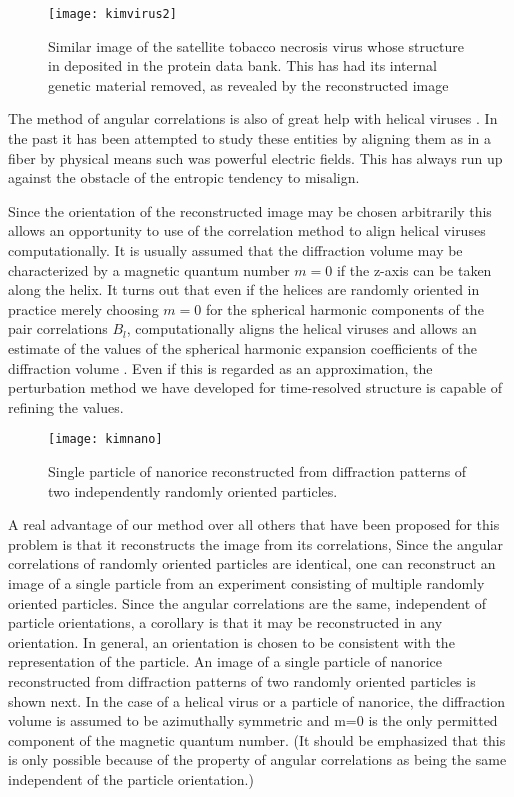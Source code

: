 \begin{figure}[ht]
  \centering
  \texttt{[image: kimvirus2]}
\caption{
Similar image of the satellite tobacco 
necrosis virus whose structure in deposited in 
the protein data bank. This has had its internal 
genetic material removed, as revealed by the 
reconstructed image
}
\label{fig:kimvirus2}
\end{figure}

The method of angular correlations is also of great help with helical viruses \cite{PoonFiber}. In the past it has been attempted to study these entities by aligning them as in a fiber by physical means such was powerful electric fields. This has always run up against the obstacle of the entropic tendency to misalign.

Since the orientation of the reconstructed image may be chosen arbitrarily this allows an opportunity to use of the correlation method to align helical viruses computationally. It is usually assumed that the diffraction volume may be characterized by a magnetic quantum number $m=0$ if the z-axis can be taken along the helix. It turns out that even if the helices are randomly oriented in practice  merely choosing $m=0$ for the spherical harmonic components of the pair correlations $B_l$, computationally aligns the helical viruses and allows an estimate of the values of the spherical harmonic expansion coefficients of the diffraction volume \cite{PoonFiber}. Even if this is regarded as an approximation, the perturbation method we have developed for time-resolved structure \cite{pande2014} is capable of refining the values.

\begin{figure}[ht]
  \centering
  \texttt{[image: kimnano]}
\caption{
Single particle of nanorice 
reconstructed from diffraction patterns of two 
independently randomly oriented particles.
}
\label{fig:kimnano}
\end{figure}

A real advantage of our method over all others that have been proposed for this problem is that it reconstructs the image from its correlations, Since the angular correlations of randomly oriented particles are identical, one can reconstruct an image of a single particle from an experiment consisting of multiple randomly oriented particles. Since the angular correlations are the same, independent of particle orientations, a corollary is that it may be reconstructed in any orientation. In general, an orientation is chosen to be consistent with the representation of the particle. An image of a single particle of nanorice reconstructed from diffraction patterns of two randomly oriented particles is shown next. 
In the case of a helical virus or a particle of nanorice, the diffraction volume is assumed to be azimuthally symmetric and m=0 is the only permitted component of the magnetic quantum number. (It should be emphasized that this is only possible because of the property of angular correlations as being the same independent of the particle orientation.)

